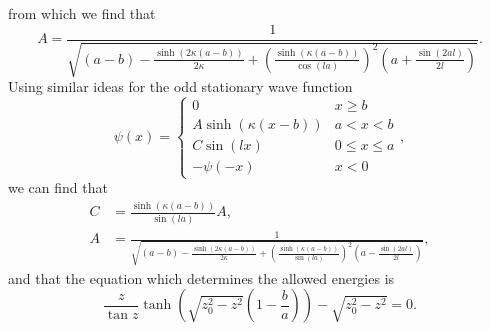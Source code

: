 \documentclass[12pt,a4paper]{article}
\begin{document}
from which we find that
\begin{equation}
A = \frac{1}{\sqrt{ (a - b) - \frac{\sinh \left( 2 \kappa (a - b) \right)}{2 \kappa}  + \left( \frac{\sinh \left(\kappa (a - b) \right)}{\cos (la)} \right)^2 \left(a + \frac{\sin(2 a l)}{2 l} \right)}}.
\end{equation}
Using similar ideas for the odd stationary wave function
\begin{equation}
\psi(x) = \begin{cases} 0 & x \geq b \\
                        A \sinh \left(\kappa (x - b) \right) & a < x < b \\
                        C \sin (l x) & 0 \leq x \leq a \\
                        -\psi(-x) & x < 0
\end{cases},
\end{equation}
we can find that
\begin{align}
C &= \frac{\sinh \left( \kappa (a - b) \right)}{\sin (l a)} A, \\
A &= \frac{1}{\sqrt{(a - b) - \frac{\sinh \left( 2 \kappa (a - b) \right)}{2 \kappa}  + \left( \frac{\sinh \left(\kappa (a - b) \right)}{\sin (la)} \right)^2 \left(a - \frac{\sin(2 a l)}{2 l} \right)}},
\end{align}
and that the equation which determines the allowed energies is
\begin{equation}
\frac{z}{\tan z} \tanh \left( \sqrt{z_0^2 - z^2} \left( 1 - \frac{b}{a} \right) \right) - \sqrt{z_0^2 - z^2} = 0. \label{eq:negOddEnergies}
\end{equation}
\end{document}
